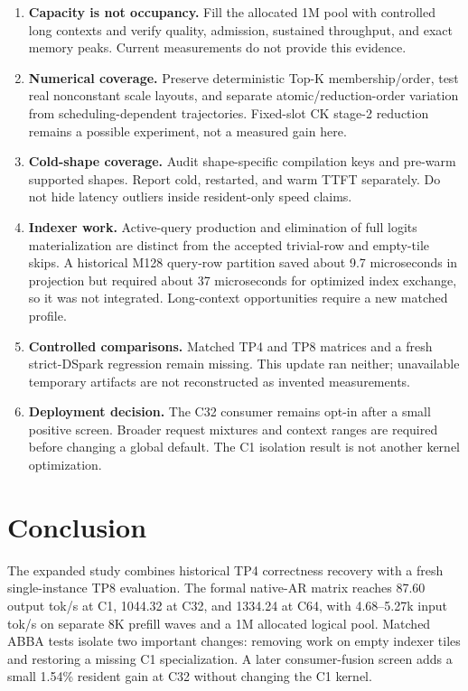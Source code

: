 \documentclass[sigplan,10pt]{acmart}
\begin{document}
\begin{enumerate}
  \item \textbf{Capacity is not occupancy.} Fill the allocated 1M pool with controlled long contexts and verify quality, admission, sustained throughput, and exact memory peaks. Current measurements do not provide this evidence.
  \item \textbf{Numerical coverage.} Preserve deterministic Top-K membership/order, test real nonconstant scale layouts, and separate atomic/reduction-order variation from scheduling-dependent trajectories. Fixed-slot CK stage-2 reduction remains a possible experiment, not a measured gain here.
  \item \textbf{Cold-shape coverage.} Audit shape-specific compilation keys
  and pre-warm supported shapes. Report cold, restarted, and warm TTFT
  separately. Do not hide latency outliers inside resident-only speed claims.
  \item \textbf{Indexer work.} Active-query production and elimination of full logits materialization are distinct from the accepted trivial-row and empty-tile skips. A historical M128 query-row partition saved about 9.7 microseconds in projection but required about 37 microseconds for optimized index exchange, so it was not integrated. Long-context opportunities require a new matched profile.
  \item \textbf{Controlled comparisons.} Matched TP4 and TP8 matrices and a fresh strict-DSpark regression remain missing. This update ran neither; unavailable temporary artifacts are not reconstructed as invented measurements.
  \item \textbf{Deployment decision.} The C32 consumer remains opt-in after a small positive screen. Broader request mixtures and context ranges are required before changing a global default. The C1 isolation result is not another kernel optimization.
\end{enumerate}

\section{Conclusion}

The expanded study combines historical TP4 correctness recovery with a fresh single-instance TP8 evaluation. The formal native-AR matrix reaches 87.60 output tok/s at C1, 1044.32 at C32, and 1334.24 at C64, with 4.68--5.27k input tok/s on separate 8K prefill waves and a 1M allocated logical pool. Matched ABBA tests isolate two important changes: removing work on empty indexer tiles and restoring a missing C1 specialization. A later consumer-fusion screen adds a small 1.54\% resident gain at C32 without changing the C1 kernel.
\end{document}

